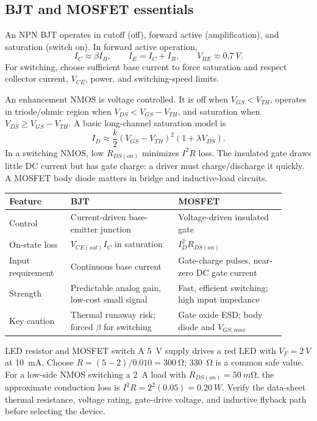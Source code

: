 \documentclass[10pt]{article}
\begin{document}
\subsection{BJT and MOSFET essentials}
An NPN BJT operates in cutoff (off), forward active (amplification), and
saturation (switch on). In forward active operation,
\begin{equation} I_C\approx\beta I_B,\qquad I_E=I_C+I_B,\qquad V_{BE}\approx\SI{0.7}{V}. \end{equation}
For switching, choose sufficient base current to force saturation and respect
collector current, $V_{CE}$, power, and switching-speed limits.

An enhancement NMOS is voltage controlled. It is off when $V_{GS}<V_{TH}$,
operates in triode/ohmic region when $V_{DS}<V_{GS}-V_{TH}$, and saturation
when $V_{DS}\ge V_{GS}-V_{TH}$. A basic long-channel saturation model is
\begin{equation} I_D\approx\frac{k}{2}(V_{GS}-V_{TH})^2(1+\lambda V_{DS}). \end{equation}
In a switching NMOS, low $R_{DS(on)}$ minimizes $I^2R$ loss. The insulated gate
draws little DC current but has gate charge: a driver must charge/discharge it
quickly. A MOSFET body diode matters in bridge and inductive-load circuits.

\begin{center}
\small
\begin{tabular}{p{0.2\linewidth}p{0.35\linewidth}p{0.35\linewidth}}
\toprule
Feature & BJT & MOSFET \\
\midrule
Control & Current-driven base-emitter junction & Voltage-driven insulated gate \\
On-state loss & $V_{CE(sat)}I_C$ in saturation & $I_D^2R_{DS(on)}$ \\
Input requirement & Continuous base current & Gate-charge pulses, near-zero DC gate current \\
Strength & Predictable analog gain, low-cost small signal & Fast, efficient switching; high input impedance \\
Key caution & Thermal runaway risk; forced $\beta$ for switching & Gate oxide ESD; body diode and $V_{GS,max}$ \\
\bottomrule
\end{tabular}
\end{center}

\begin{examplebox}{LED resistor and MOSFET switch}
A \SI{5}{V} supply drives a red LED with $V_F=\SI{2}{V}$ at \SI{10}{mA}.
Choose $R=(5-2)/0.010=\SI{300}{\ohm}$; \SI{330}{\ohm} is a common safe value.
For a low-side NMOS switching a \SI{2}{A} load with $R_{DS(on)}=\SI{50}{m\ohm}$,
the approximate conduction loss is $I^2R=2^2(0.05)=\SI{0.20}{W}$. Verify the
data-sheet thermal resistance, voltage rating, gate-drive voltage, and inductive
flyback path before selecting the device.
\end{examplebox}
\end{document}
